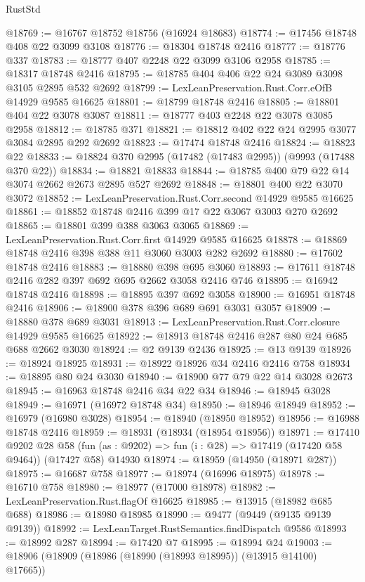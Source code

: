 \begin{lexlean}{RustStd}
\begin{coremodule}
@18769 := @16767 @18752 @18756 (@16924 @18683)
@18774 := @17456 @18748 @408 @22 @3099 @3108
@18776 := @18304 @18748 @2416
@18777 := @18776 @337
@18783 := @18777 @407 @2248 @22 @3099 @3106 @2958
@18785 := @18317 @18748 @2416
@18795 := @18785 @404 @406 @22 @24 @3089 @3098 @3105 @2895 @532 @2692
@18799 := LexLeanPreservation.Rust.Corr.eOfB @14929 @9585 @16625
@18801 := @18799 @18748 @2416
@18805 := @18801 @404 @22 @3078 @3087
@18811 := @18777 @403 @2248 @22 @3078 @3085 @2958
@18812 := @18785 @371
@18821 := @18812 @402 @22 @24 @2995 @3077 @3084 @2895 @292 @2692
@18823 := @17474 @18748 @2416
@18824 := @18823 @22
@18833 := @18824 @370 @2995 (@17482 (@17483 @2995)) (@9993 (@17488 @370 @22))
@18834 := @18821 @18833
@18844 := @18785 @400 @79 @22 @14 @3074 @2662 @2673 @2895 @527 @2692
@18848 := @18801 @400 @22 @3070 @3072
@18852 := LexLeanPreservation.Rust.Corr.second @14929 @9585 @16625
@18861 := @18852 @18748 @2416 @399 @17 @22 @3067 @3003 @270 @2692
@18865 := @18801 @399 @388 @3063 @3065
@18869 := LexLeanPreservation.Rust.Corr.first @14929 @9585 @16625
@18878 := @18869 @18748 @2416 @398 @388 @11 @3060 @3003 @282 @2692
@18880 := @17602 @18748 @2416
@18883 := @18880 @398 @695 @3060
@18893 := @17611 @18748 @2416 @282 @397 @692 @695 @2662 @3058 @2416 @746
@18895 := @16942 @18748 @2416
@18898 := @18895 @397 @692 @3058
@18900 := @16951 @18748 @2416
@18906 := @18900 @378 @396 @689 @691 @3031 @3057
@18909 := @18880 @378 @689 @3031
@18913 := LexLeanPreservation.Rust.Corr.closure @14929 @9585 @16625
@18922 := @18913 @18748 @2416 @287 @80 @24 @685 @688 @2662 @3030
@18924 := @2 @9139 @2436
@18925 := @13 @9139
@18926 := @18924 @18925
@18931 := @18922 @18926 @34 @2416 @2416 @758
@18934 := @18895 @80 @24 @3030
@18940 := @18900 @77 @79 @22 @14 @3028 @2673
@18945 := @16963 @18748 @2416 @34 @22 @34
@18946 := @18945 @3028
@18949 := @16971 (@16972 @18748 @34)
@18950 := @18946 @18949
@18952 := @16979 (@16980 @3028)
@18954 := @18940 (@18950 @18952)
@18956 := @16988 @18748 @2416
@18959 := @18931 (@18934 (@18954 @18956))
@18971 := @17410
    @9202
    @28
    @58
    (fun (as : @9202) => fun (i : @28) => @17419 (@17420 @58 @9464))
    (@17427 @58)
    @14930
@18974 := @18959 (@14950 (@18971 @287))
@18975 := @16687 @758
@18977 := @18974 (@16996 @18975)
@18978 := @16710 @758
@18980 := @18977 (@17000 @18978)
@18982 := LexLeanPreservation.Rust.flagOf @16625
@18985 := @13915 (@18982 @685 @688)
@18986 := @18980 @18985
@18990 := @9477 (@9449 (@9135 @9139 @9139))
@18992 := LexLeanTarget.RustSemantics.findDispatch @9586
@18993 := @18992 @287
@18994 := @17420 @7
@18995 := @18994 @24
@19003 := @18906 (@18909 (@18986 (@18990 (@18993 @18995)) (@13915 @14100) @17665))

\end{coremodule}
\end{lexlean}
